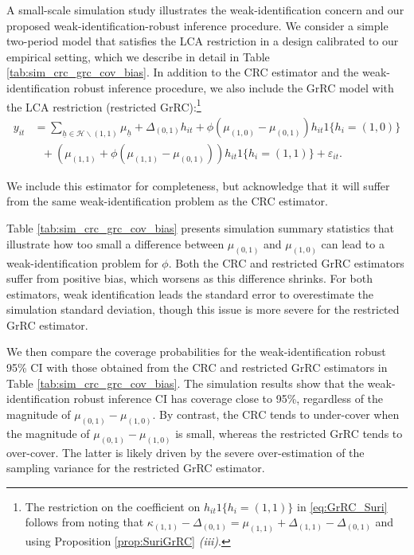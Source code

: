\documentclass[12pt]{article}
\theoremstyle{plain}
\theoremstyle{definition}
\begin{document}
A small-scale simulation study illustrates the weak-identification concern and our proposed weak-identification-robust inference procedure.
We consider a simple two-period model that satisfies the LCA restriction in a design calibrated to our empirical setting, which we describe in detail in Table \ref{tab:sim_crc_grc_cov_bias}.  
In addition to the CRC estimator and the weak-identification robust inference procedure, we also include the GrRC model with the LCA restriction (restricted GrRC):\footnote{The restriction on the coefficient on $h_{it}1\{h_{i}=(1,1)\}$ in \eqref{eq:GrRC_Suri} follows from noting that $\kappa_{(1,1)}-\Delta_{(0,1)}=\mu_{(1,1)}+\Delta_{(1,1)}-\Delta_{(0,1)}$ and using Proposition \ref{prop:SuriGrRC} \emph{(iii)}.}
\begin{align}
y_{it}&=\sum_{\underline{h}\in\mathcal{H}\backslash (1,1)}\mu_{\underline{h}}+\Delta_{(0,1)}h_{it}+\phi(\mu_{(1,0)}-\mu_{(0,1)})h_{it}1\{h_{i}=(1,0)\}\nonumber\\
&~~~+\left(\mu_{(1,1)}+\phi\left(\mu_{(1,1)}-\mu_{(0,1)}\right)\right)h_{it}1\{h_{i}=(1,1)\}+\varepsilon_{it}.\label{eq:GrRC_Suri}
\end{align}

\noindent We include this estimator for completeness, but acknowledge that it will suffer from the same weak-identification problem as the CRC estimator.

Table \ref{tab:sim_crc_grc_cov_bias} presents simulation summary statistics that illustrate how too small a difference between $\mu_{(0,1)}$ and $\mu_{(1,0)}$ can lead to a weak-identification problem for $\phi$.  
Both the CRC and restricted GrRC estimators suffer from positive bias, which worsens as this difference shrinks.  
For both estimators, weak identification leads the standard error to overestimate the simulation standard deviation, though this issue is more severe for the restricted GrRC estimator.

We then compare the coverage probabilities for the weak-identification robust 95\% CI with those obtained from the CRC and restricted GrRC estimators in Table \ref{tab:sim_crc_grc_cov_bias}. 
The simulation results show that the weak-identification robust inference CI has coverage close to 95\%, regardless of the magnitude of $\mu_{(0,1)}-\mu_{(1,0)}$.
By contrast, the CRC tends to under-cover when the magnitude of $\mu_{(0,1)}-\mu_{(1,0)}$ is small, whereas the restricted GrRC tends to over-cover. The latter is likely driven by the severe over-estimation of the sampling variance for the restricted GrRC estimator.
\end{document}
